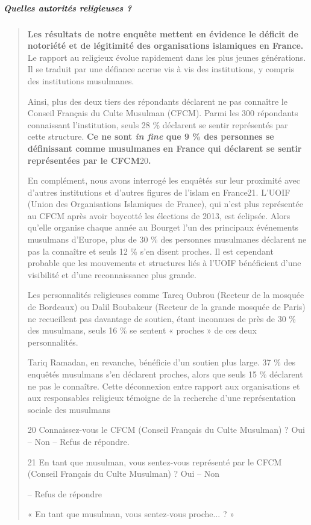 \hypertarget{quelles-autorituxe9s-religieuses}{%
\subparagraph{Quelles autorités religieuses
?}\label{quelles-autorituxe9s-religieuses}}

\begin{quote}
\textbf{Les résultats de notre enquête mettent en évidence le déficit de
notoriété et de légitimité des organisations islamiques en France.} Le
rapport au religieux évolue rapidement dans les plus jeunes générations.
Il se traduit par une défiance accrue vis à vis des institutions, y
compris des institutions musulmanes.

Ainsi, plus des deux tiers des répondants déclarent ne pas connaître le
Conseil Français du Culte Musulman (CFCM). Parmi les 300 répondants
connaissant l'institution, seuls 28 \% déclarent se sentir représentés
par cette structure. \textbf{Ce ne sont \emph{in fine} que 9 \% des
personnes se définissant comme musulmanes en France qui déclarent se
sentir représentées par le CFCM}20\textbf{.}

En complément, nous avons interrogé les enquêtés sur leur proximité avec
d'autres institutions et d'autres figures de l'islam en France21. L'UOIF
(Union des Organisations Islamiques de France), qui n'est plus
représentée au CFCM après avoir boycotté les élections de 2013, est
éclipsée. Alors qu'elle organise chaque année au Bourget l'un des
principaux événements musulmans d'Europe, plus de 30 \% des personnes
musulmanes déclarent ne pas la connaître et seuls 12 \% s'en disent
proches. Il est cependant probable que les mouvements et structures liés
à l'UOIF bénéficient d'une visibilité et d'une reconnaissance plus
grande.

Les personnalités religieuses comme Tareq Oubrou (Recteur de la mosquée
de Bordeaux) ou Dalil Boubakeur (Recteur de la grande mosquée de Paris)
ne recueillent pas davantage de soutien, étant inconnues de près de 30
\% des musulmans, seuls 16 \% se sentent « proches » de ces deux
personnalités.

Tariq Ramadan, en revanche, bénéficie d'un soutien plus large. 37 \% des
enquêtés musulmans s'en déclarent proches, alors que seuls 15 \%
déclarent ne pas le connaître. Cette déconnexion entre rapport aux
organisations et aux responsables religieux témoigne de la recherche
d'une représentation sociale des musulmans

20 Connaissez-vous le CFCM (Conseil Français du Culte Musulman) ? Oui --
Non -- Refus de répondre.

21 En tant que musulman, vous sentez-vous représenté par le CFCM
(Conseil Français du Culte Musulman) ? Oui -- Non

-- Refus de répondre

« En tant que musulman, vous sentez-vous proche... ? »
\end{quote}


